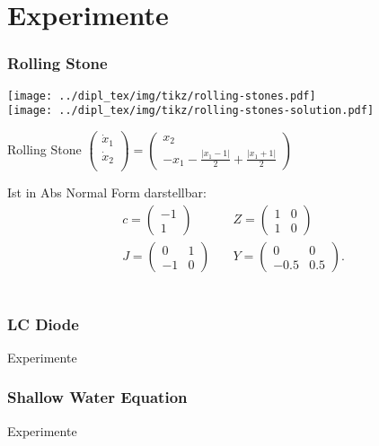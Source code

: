 \section[Experimente]{Experimente}

\begin{frame}[<+->]
\frametitle{Rolling Stone}
\begin{minipage}[c]{0.35\textwidth}
  \texttt{[image: ../dipl\_tex/img/tikz/rolling-stones.pdf]} \\
  \texttt{[image: ../dipl\_tex/img/tikz/rolling-stones-solution.pdf]}		
\end{minipage}
\hfill
\begin{minipage}[c]{0.55\textwidth}
\begin{block}{Rolling Stone}
\centering
  $
  \begin{pmatrix}
   \dot x_1 \\
   \dot x_2 \\
  \end{pmatrix}
 = 
 \begin{pmatrix}
  x_2 \\
  -x_1 - \frac{|x_1-1|}{2} + \frac{|x_1+1|}{2}
 \end{pmatrix}
$
\end{block}
Ist in Abs Normal Form darstellbar:
\[
\begin{aligned}
c = \begin{pmatrix}
     -1\\
     1
    \end{pmatrix}
\quad &
 Z = \begin{pmatrix}
      1 & 0 \\
      1 & 0
     \end{pmatrix}\\
J = \begin{pmatrix}
      0&1\\
      -1 & 0
     \end{pmatrix}
\quad &
 Y = \begin{pmatrix}
      0 & 0\\
      -0.5  & 0.5
     \end{pmatrix}.
     \end{aligned}
\]
\\[0.5cm]
\end{minipage}

\end{frame}
\begin{frame}[<+->]
\frametitle{LC Diode}
    
    Experimente

\end{frame}

\begin{frame}[<+->]
\frametitle{Shallow Water Equation}
    
    Experimente

\end{frame}